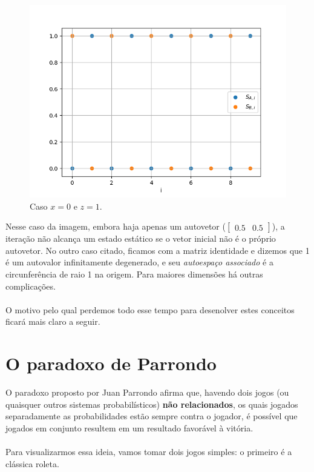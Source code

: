 \documentclass[12pt]{article}
\begin{document}
\begin{figure}[H]
\centering
\includegraphics[scale=0.6]{graph3.png}
\caption{Caso $x = 0$ e $z = 1$.}
\end{figure}

Nesse caso da imagem, embora haja apenas um autovetor ($\begin{bmatrix} 0.5 & 0.5 \end{bmatrix}$), a iteração não alcança um estado estático se o vetor inicial não é o próprio autovetor. No outro caso citado, ficamos com a matriz identidade e dizemos que 1 é um autovalor infinitamente degenerado, e seu \textit{autoespaço associado} é a circunferência de raio 1 na origem. Para maiores dimensões há outras complicações.\\
\\
O motivo pelo qual perdemos todo esse tempo para desenolver estes conceitos ficará mais claro a seguir.

\section{O paradoxo de Parrondo}

O paradoxo proposto por Juan Parrondo afirma que, havendo dois jogos (ou quaisquer outros sistemas probabilísticos) \textbf{não relacionados}, os quais jogados separadamente as probabilidades estão sempre contra o jogador, é possível que jogados em conjunto resultem em um resultado favorável à vitória.\\
\\
Para visualizarmos essa ideia, vamos tomar dois jogos simples: o primeiro é a clássica roleta.
\end{document}
